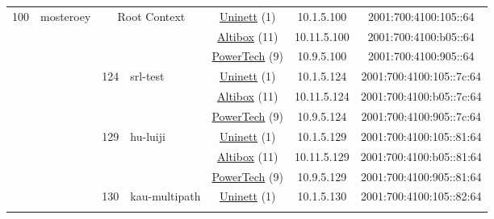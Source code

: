 \begin{small}
\begin{center}
\begin{longtable}{|c|c|c|c|c|c|c|c|}
 \multirow{33}{*}{\tiny{100}} & \multicolumn{1}{|l|}{\multirow{33}{*}{\tiny{mosteroey}}} & \multicolumn{2}{|c|}{\multirow{3}{*}{\tiny{Root Context}}} & \multicolumn{2}{|c|}{\tiny{\href{https://www.uninett.no}{Uninett} (1)}} & \tiny{10.1.5.100} & \tiny{2001:700:4100:105::64} \\* \cline{5-5}\cline{6-6}\cline{7-7}\cline{8-8}
  &  & \multicolumn{2}{|c|}{} & \multicolumn{2}{|c|}{\tiny{\href{https://www.altibox.no}{Altibox} (11)}} & \tiny{10.11.5.100} & \tiny{2001:700:4100:b05::64} \\* \cline{5-5}\cline{6-6}\cline{7-7}\cline{8-8}
  &  & \multicolumn{2}{|c|}{} & \multicolumn{2}{|c|}{\tiny{\href{http://www.powertech.no}{PowerTech} (9)}} & \tiny{10.9.5.100} & \tiny{2001:700:4100:905::64} \\* \cline{3-3}\cline{4-4}\cline{5-5}\cline{6-6}\cline{7-7}\cline{8-8}
  &  & \multirow{3}{*}{\tiny{124}} & \multicolumn{1}{|l|}{\multirow{3}{*}{\tiny{srl-test}}} & \multicolumn{2}{|c|}{\tiny{\href{https://www.uninett.no}{Uninett} (1)}} & \tiny{10.1.5.124} & \tiny{2001:700:4100:105::7c:64} \\* \cline{5-5}\cline{6-6}\cline{7-7}\cline{8-8}
  &  &  &  & \multicolumn{2}{|c|}{\tiny{\href{https://www.altibox.no}{Altibox} (11)}} & \tiny{10.11.5.124} & \tiny{2001:700:4100:b05::7c:64} \\* \cline{5-5}\cline{6-6}\cline{7-7}\cline{8-8}
  &  &  &  & \multicolumn{2}{|c|}{\tiny{\href{http://www.powertech.no}{PowerTech} (9)}} & \tiny{10.9.5.124} & \tiny{2001:700:4100:905::7c:64} \\* \cline{3-3}\cline{4-4}\cline{5-5}\cline{6-6}\cline{7-7}\cline{8-8}
  &  & \multirow{3}{*}{\tiny{129}} & \multicolumn{1}{|l|}{\multirow{3}{*}{\tiny{hu-luiji}}} & \multicolumn{2}{|c|}{\tiny{\href{https://www.uninett.no}{Uninett} (1)}} & \tiny{10.1.5.129} & \tiny{2001:700:4100:105::81:64} \\* \cline{5-5}\cline{6-6}\cline{7-7}\cline{8-8}
  &  &  &  & \multicolumn{2}{|c|}{\tiny{\href{https://www.altibox.no}{Altibox} (11)}} & \tiny{10.11.5.129} & \tiny{2001:700:4100:b05::81:64} \\* \cline{5-5}\cline{6-6}\cline{7-7}\cline{8-8}
  &  &  &  & \multicolumn{2}{|c|}{\tiny{\href{http://www.powertech.no}{PowerTech} (9)}} & \tiny{10.9.5.129} & \tiny{2001:700:4100:905::81:64} \\* \cline{3-3}\cline{4-4}\cline{5-5}\cline{6-6}\cline{7-7}\cline{8-8}
  &  & \multirow{3}{*}{\tiny{130}} & \multicolumn{1}{|l|}{\multirow{3}{*}{\tiny{kau-multipath}}} & \multicolumn{2}{|c|}{\tiny{\href{https://www.uninett.no}{Uninett} (1)}} & \tiny{10.1.5.130} & \tiny{2001:700:4100:105::82:64} \\* \cline{5-5}\cline{6-6}\cline{7-7}\cline{8-8}

\end{longtable}
\end{center}
\end{small}
